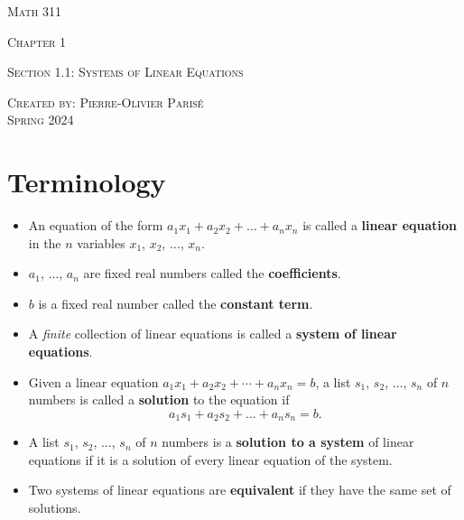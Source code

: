 \documentclass[20pt,a4paper]{extarticle}
\newcounter{definition}
\begin{document}
\thispagestyle{empty}

\begin{center}
\vspace*{2.5cm}

{\Huge \textsc{Math 311}}

\vspace*{2cm}

{\LARGE \textsc{Chapter 1}} 

\vspace*{0.75cm}

\noindent\textsc{Section 1.1: Systems of Linear Equations}

\vspace*{0.75cm}

\tableofcontents

\vfill

\noindent \textsc{Created by: Pierre-Olivier Paris{\'e}} \\
\textsc{Spring 2024}
\end{center}

\newpage

\section{Terminology}

\begin{definition}

\begin{itemize}
	\item An equation of the form $a_1 x_1 + a_2 x_2 + \ldots + a_n x_n$ is called a \textbf{linear equation} in the $n$ variables $x_1$, $x_2$, $\ldots$, $x_n$.
	\item $a_1$, $\ldots$, $a_n$ are fixed real numbers called the \textbf{coefficients}.
	\item $b$ is a fixed real number called the \textbf{constant term}.
	\item A \textit{finite} collection of linear equations is called a \textbf{system of linear equations}.
\end{itemize}

\end{definition}

\begin{definition}

\begin{itemize}
	\item Given a linear equation $a_1 x_1 + a_2 x_2 + \cdots + a_n x_n = b$, a list $s_1$, $s_2$, $\ldots$, $s_n$ of $n$ numbers is called a \textbf{solution} to the equation if
		\[
			a_1 s_1 + a_2 s_2 + \ldots + a_n s_n = b .
		\]
	\item A list $s_1$, $s_2$, $\ldots$, $s_n$ of $n$ numbers is a \textbf{solution to a system} of linear equations if it is a solution of every linear equation of the system.
	\item Two systems of linear equations are \textbf{equivalent} if they have the same set of solutions.
\end{itemize}

\end{definition}
\end{document}

